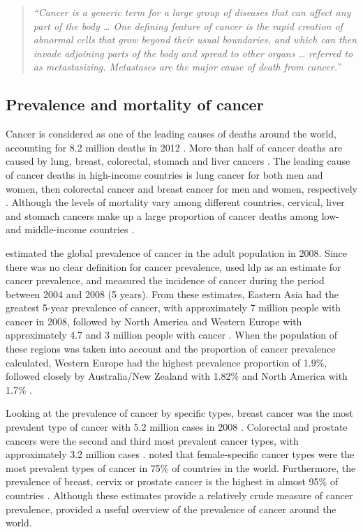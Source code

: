 \begin{quote}
	\textit{
	``Cancer is a generic term for a large group of diseases that can affect any part of the body \ldots{}
	One defining feature of cancer is the rapid creation of abnormal cells that grow beyond their usual boundaries, and which can then invade adjoining parts of the body and spread to other organs \ldots{}
	referred to as metastasizing.
	Metastases are the major cause of death from cancer.''
	\citep{WHO2016}
	}
\end{quote}

\subsection{Prevalence and mortality of cancer}
\label{sub:prevalence_and_mortality_of_cancer}

Cancer is considered as one of the leading causes of deaths around the world, accounting for 8.2 million deaths in 2012 \citep{WHO2014}.
More than half of cancer deaths are caused by lung, breast, colorectal, stomach and liver cancers \citep{WHO2014}.
The leading cause of cancer deaths in high-income countries is lung cancer for both men and women, then colorectal cancer and breast cancer for men and women, respectively \citep{WHO2014}.
Although the levels of mortality vary among different countries, cervical, liver and stomach cancers make up a large proportion of cancer deaths among low- and middle-income countries \citep{WHO2014}.

\citet{Bray2013} estimated the global prevalence of cancer in the adult population in 2008.
Since there was no clear definition for cancer prevalence, \citet{Bray2013} used \gls{ldp} as an estimate for cancer prevalence, and measured the incidence of cancer during the period between 2004 and 2008 (5 years).
From these estimates, Eastern Asia had the greatest 5-year prevalence of cancer, with approximately 7 million people with cancer in 2008, followed by North America and Western Europe with approximately 4.7 and 3 million people with cancer \citep{Bray2013}.
When the population of these regions was taken into account and the proportion of cancer prevalence calculated, Western Europe had the highest prevalence proportion of 1.9\%, followed closely by Australia/New Zealand with 1.82\% and North America with 1.7\% \citep{Bray2013}.

Looking at the prevalence of cancer by specific types, breast cancer was the most prevalent type of cancer with 5.2 million cases in 2008 \citep{Bray2013}.
Colorectal and prostate cancers were the second and third most prevalent cancer types, with approximately 3.2 million cases \citep{Bray2013}.
\citet{Bray2013} noted that female-specific cancer types were the most prevalent types of cancer in 75\% of countries in the world.
Furthermore, the prevalence of breast, cervix or prostate cancer is the highest in almost 95\% of countries \citep{Bray2013}.
Although these estimates provide a relatively crude measure of cancer prevalence, \citet{Bray2013} provided a useful overview of the prevalence of cancer  around the world.

